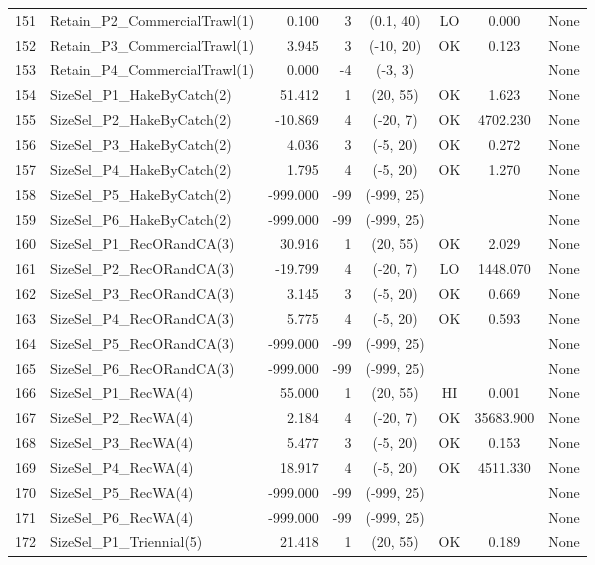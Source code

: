 \documentclass[12pt,]{article}
\begin{document}
\begin{landscape}
\begin{longtable}{rlrrcccl}
  151 & Retain\_P2\_CommercialTrawl(1) & 0.100 & 3 & (0.1, 40) & LO & 0.000 & None \\ 
  152 & Retain\_P3\_CommercialTrawl(1) & 3.945 & 3 & (-10, 20) & OK & 0.123 & None \\ 
  153 & Retain\_P4\_CommercialTrawl(1) & 0.000 & -4 & (-3, 3) &  &  & None \\ 
  154 & SizeSel\_P1\_HakeByCatch(2) & 51.412 & 1 & (20, 55) & OK & 1.623 & None \\ 
  155 & SizeSel\_P2\_HakeByCatch(2) & -10.869 & 4 & (-20, 7) & OK & 4702.230 & None \\ 
  156 & SizeSel\_P3\_HakeByCatch(2) & 4.036 & 3 & (-5, 20) & OK & 0.272 & None \\ 
  157 & SizeSel\_P4\_HakeByCatch(2) & 1.795 & 4 & (-5, 20) & OK & 1.270 & None \\ 
  158 & SizeSel\_P5\_HakeByCatch(2) & -999.000 & -99 & (-999, 25) &  &  & None \\ 
  159 & SizeSel\_P6\_HakeByCatch(2) & -999.000 & -99 & (-999, 25) &  &  & None \\ 
  160 & SizeSel\_P1\_RecORandCA(3) & 30.916 & 1 & (20, 55) & OK & 2.029 & None \\ 
  161 & SizeSel\_P2\_RecORandCA(3) & -19.799 & 4 & (-20, 7) & LO & 1448.070 & None \\ 
  162 & SizeSel\_P3\_RecORandCA(3) & 3.145 & 3 & (-5, 20) & OK & 0.669 & None \\ 
  163 & SizeSel\_P4\_RecORandCA(3) & 5.775 & 4 & (-5, 20) & OK & 0.593 & None \\ 
  164 & SizeSel\_P5\_RecORandCA(3) & -999.000 & -99 & (-999, 25) &  &  & None \\ 
  165 & SizeSel\_P6\_RecORandCA(3) & -999.000 & -99 & (-999, 25) &  &  & None \\ 
  166 & SizeSel\_P1\_RecWA(4) & 55.000 & 1 & (20, 55) & HI & 0.001 & None \\ 
  167 & SizeSel\_P2\_RecWA(4) & 2.184 & 4 & (-20, 7) & OK & 35683.900 & None \\ 
  168 & SizeSel\_P3\_RecWA(4) & 5.477 & 3 & (-5, 20) & OK & 0.153 & None \\ 
  169 & SizeSel\_P4\_RecWA(4) & 18.917 & 4 & (-5, 20) & OK & 4511.330 & None \\ 
  170 & SizeSel\_P5\_RecWA(4) & -999.000 & -99 & (-999, 25) &  &  & None \\ 
  171 & SizeSel\_P6\_RecWA(4) & -999.000 & -99 & (-999, 25) &  &  & None \\ 
  172 & SizeSel\_P1\_Triennial(5) & 21.418 & 1 & (20, 55) & OK & 0.189 & None \\ 

\end{longtable}
\end{landscape}
\end{document}

